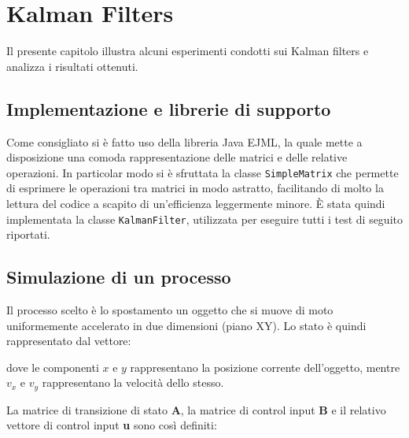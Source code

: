 \chapter{Kalman Filters}

Il presente capitolo illustra alcuni esperimenti condotti sui Kalman filters e analizza i risultati ottenuti.

\section{Implementazione e librerie di supporto}
Come consigliato si è fatto uso della libreria Java EJML, la quale mette a disposizione una comoda rappresentazione delle matrici e delle relative operazioni. In particolar modo si è sfruttata la classe \texttt{SimpleMatrix} che permette di esprimere le operazioni tra matrici in modo astratto, facilitando di molto la lettura del codice a scapito di un'efficienza leggermente minore. È stata quindi implementata la classe \texttt{KalmanFilter}, utilizzata per eseguire tutti i test di seguito riportati.

\section{Simulazione di un processo}

Il processo scelto è lo spostamento un oggetto che si muove di moto uniformemente accelerato in due dimensioni (piano XY). Lo stato è quindi rappresentato dal vettore:

dove le componenti $x$ e $y$ rappresentano la posizione corrente dell'oggetto, mentre $v_x$ e $v_y$ rappresentano la velocità dello stesso.

La matrice di transizione di stato \textbf{A}, la matrice di control input \textbf{B} e il relativo vettore di control input \textbf{u} sono così definiti:

